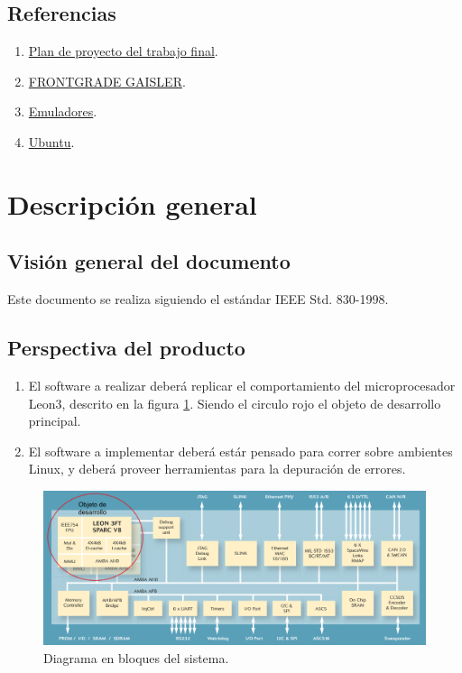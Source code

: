 \documentclass[
  11pt, %
  codirector, %
]{charter}
\begin{document}
\subsection{Referencias}
\label{sec:org62711e0}

\begin{enumerate}
\item \href{https://github.com/NicolasIriarte/Plan-proyecto-final/blob/main/IriarteNicolas.pdf}{Plan de proyecto del trabajo final}.
\item \href{https://www.gaisler.com/index.php/products/processors/leon3}{FRONTGRADE GAISLER}.
\item \href{https://en.wikipedia.org/wiki/Emulator}{Emuladores}.
\item \href{https://ubuntu.com/}{Ubuntu}.

\end{enumerate}

\section{Descripción general}
\label{sec:orgc1c4017}

\subsection{Visión general del documento}
\label{sec:orgdaca22c}

Este documento se realiza siguiendo el estándar IEEE Std. 830-1998.


\subsection{Perspectiva del producto}
\label{sec:org24980a8}

\begin{enumerate}
\item El software a realizar deberá replicar el comportamiento del microprocesador Leon3, descrito en la figura \ref{fig:Components}. Siendo el circulo rojo el objeto de desarrollo principal.
\item El software a implementar deberá estár pensado para correr sobre ambientes Linux, y deberá proveer herramientas para la depuración de errores.
\end{enumerate}

\begin{figure}[htpb]
  \centering
  \label{fig:Components}
  \includegraphics[width=1\textwidth]{./Figuras/Components.png}
  \caption{Diagrama en bloques del sistema.}
\end{figure}
\end{document}
